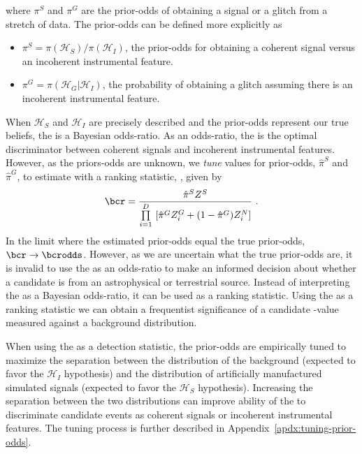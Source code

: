 where $\pi^S$ and $\pi^G$ are the prior-odds of obtaining a signal or a glitch from a stretch of data. The prior-odds can be defined more explicitly as 
\begin{itemize}
    \item $\pi^S=\pi(\mathcal{H}_S)/\pi(\mathcal{H}_I)$, the prior-odds for obtaining a coherent signal versus an incoherent instrumental feature.
    \item $\pi^G=\pi(\mathcal{H}_G| \mathcal{H}_I)$, the probability of obtaining a glitch assuming there is an incoherent instrumental feature.
\end{itemize}



When $\mathcal{H}_S$ and $\mathcal{H}_I$ are precisely described and the prior-odds represent our true beliefs, the \bcrodds is a Bayesian odds-ratio. As an odds-ratio, the \bcrodds is the optimal discriminator between coherent signals and incoherent instrumental features. However, as the priors-odds are unknown, we \textit{tune} values for prior-odds, $\hat{\pi}^S$ and $\hat{\pi}^G$, to estimate \bcrodds with a ranking statistic, \bcr, given by
\begin{equation}
\label{eq:bcr}
\bcr = \frac{\hat{\pi}^S Z^S}{\prod\limits^D_{i=1} \ [\hat{\pi}^G Z^G_i + (1-\hat{\pi}^G)Z^N_i]}\ .
\end{equation}
In the limit where the estimated prior-odds equal the true prior-odds, $\bcr\to\bcrodds$. However, as we are uncertain what the true prior-odds are, it is invalid to use the \bcr as an odds-ratio to make an informed decision about whether a candidate is from an astrophysical or terrestrial source. Instead of interpreting the \bcr as a Bayesian odds-ratio, it can be used as a ranking statistic. Using the \bcr as a ranking statistic we can obtain a frequentist significance of a candidate \bcr-value measured against a background \bcr distribution. 

When using the \bcr as a detection statistic, the prior-odds are empirically tuned to maximize the separation between the \bcr distribution of the background (expected to favor the $\mathcal{H}_I$ hypothesis) and the \bcr distribution of artificially manufactured simulated signals (expected to favor the $\mathcal{H}_S$ hypothesis). Increasing the separation between the two distributions can improve ability of the \bcr to discriminate candidate events as coherent signals or incoherent instrumental features. The tuning process is further described in Appendix~\ref{apdx:tuning-prior-odds}. 

